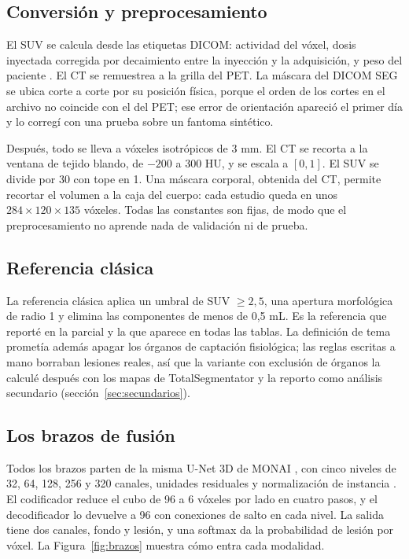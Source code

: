 \subsection{Conversión y preprocesamiento}

El SUV se calcula desde las etiquetas DICOM: actividad del vóxel, dosis inyectada corregida por decaimiento entre la inyección y la adquisición, y peso del paciente \citep{boellaard2015}. El CT se remuestrea a la grilla del PET. La máscara del DICOM SEG se ubica corte a corte por su posición física, porque el orden de los cortes en el archivo no coincide con el del PET; ese error de orientación apareció el primer día y lo corregí con una prueba sobre un fantoma sintético.

Después, todo se lleva a vóxeles isotrópicos de 3 mm. El CT se recorta a la ventana de tejido blando, de $-200$ a 300 HU, y se escala a $[0,1]$. El SUV se divide por 30 con tope en 1. Una máscara corporal, obtenida del CT, permite recortar el volumen a la caja del cuerpo: cada estudio queda en unos $284\times120\times135$ vóxeles. Todas las constantes son fijas, de modo que el preprocesamiento no aprende nada de validación ni de prueba.

\subsection{Referencia clásica}

La referencia clásica aplica un umbral de SUV $\geq 2{,}5$, una apertura morfológica de radio 1 y elimina las componentes de menos de 0,5 mL. Es la referencia que reporté en la parcial y la que aparece en todas las tablas. La definición de tema prometía además apagar los órganos de captación fisiológica; las reglas escritas a mano borraban lesiones reales, así que la variante con exclusión de órganos la calculé después con los mapas de TotalSegmentator \citep{wasserthal2023} y la reporto como análisis secundario (sección~\ref{sec:secundarios}).

\subsection{Los brazos de fusión}

Todos los brazos parten de la misma U-Net 3D de MONAI \citep{ronneberger2015,cicek2016,cardoso2022monai}, con cinco niveles de 32, 64, 128, 256 y 320 canales, unidades residuales y normalización de instancia \citep{ulyanov2016}. El codificador reduce el cubo de 96 a 6 vóxeles por lado en cuatro pasos, y el decodificador lo devuelve a 96 con conexiones de salto en cada nivel. La salida tiene dos canales, fondo y lesión, y una softmax da la probabilidad de lesión por vóxel. La Figura~\ref{fig:brazos} muestra cómo entra cada modalidad.

